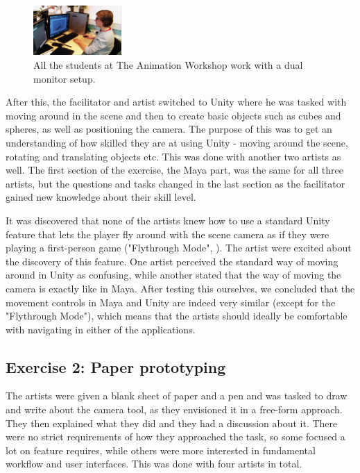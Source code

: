 \begin{figure}[htbp]
\centering
\includegraphics[width=0.3\textwidth]{Pics/Mads_dual}
\caption{All the students at The Animation Workshop work with a dual monitor setup.}
\label{fig:mads_dual}
\end{figure}

After this, the facilitator and artist switched to Unity where he was tasked with moving around in the scene and then to create basic objects such as cubes and spheres, as well as positioning the camera. The purpose of this was to get an understanding of how skilled they are at using Unity - moving around the scene, rotating and translating objects etc. This was done with another two artists as well. The first section of the exercise, the Maya part, was the same for all three artists, but the questions and tasks changed in the last section as the facilitator gained new knowledge about their skill level.

It was discovered that none of the artists knew how to use a standard Unity feature that lets the player fly around with the scene camera as if they were playing a first-person game ("Flythrough Mode", \cite{unity_flyMode}). The artist were excited about the discovery of this feature. One artist perceived the standard way of moving around in Unity as confusing, while another stated that the way of moving the camera is exactly like in Maya. After testing this ourselves, we concluded that the movement controls in Maya and Unity are indeed very similar (except for the "Flythrough Mode"), which means that the artists should ideally be comfortable with navigating in either of the applications.

\subsection{Exercise 2: Paper prototyping}
The artists were given a blank sheet of paper and a pen and was tasked to draw and write about the camera tool, as they envisioned it in a free-form approach. They then explained what they did and they had a discussion about it. There were no strict requirements of how they approached the task, so some focused a lot on feature requires, while others were more interested in fundamental workflow and user interfaces. This was done with four artists in total.

